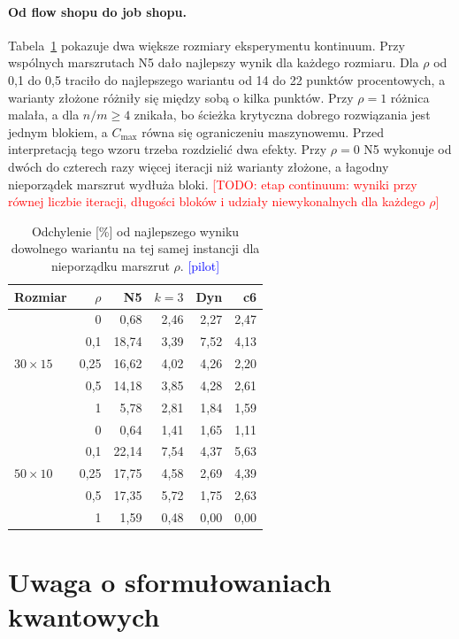 \documentclass[10pt,twocolumn]{article}
\newcommand{\todo}[1]{\textcolor{red}{[TODO: #1]}}
\newcommand{\pilot}{\textcolor{blue}{[pilot]}}
\newcommand{\Cmax}{C_{\max}}
\begin{document}
\paragraph{Od flow shopu do job shopu.}
Tabela~\ref{tab:rho} pokazuje dwa większe rozmiary eksperymentu
kontinuum. Przy wspólnych marszrutach N5 dało najlepszy wynik dla każdego
rozmiaru. Dla $\rho$ od 0,1 do 0,5 traciło do najlepszego wariantu od 14
do 22 punktów procentowych, a warianty złożone różniły się między sobą
o kilka punktów. Przy $\rho=1$ różnica malała, a dla $n/m\ge4$ znikała,
bo ścieżka krytyczna dobrego rozwiązania jest jednym blokiem, a $\Cmax$
równa się ograniczeniu maszynowemu. Przed interpretacją tego wzoru trzeba
rozdzielić dwa efekty. Przy $\rho=0$ N5 wykonuje od dwóch do czterech
razy więcej iteracji niż warianty złożone, a łagodny nieporządek marszrut
wydłuża bloki. \todo{etap continuum: wyniki przy równej liczbie iteracji,
długości bloków i udziały niewykonalnych dla każdego $\rho$}

\begin{table}[t]
\centering\small
\begin{tabular}{@{}lrrrrr@{}}
\toprule
Rozmiar & $\rho$ & N5 & $k{=}3$ & Dyn & c6 \\
\midrule
\multirow{5}{*}{$30\times15$}
 & 0    & 0,68  & 2,46 & 2,27 & 2,47 \\
 & 0,1  & 18,74 & 3,39 & 7,52 & 4,13 \\
 & 0,25 & 16,62 & 4,02 & 4,26 & 2,20 \\
 & 0,5  & 14,18 & 3,85 & 4,28 & 2,61 \\
 & 1    & 5,78  & 2,81 & 1,84 & 1,59 \\
\midrule
\multirow{5}{*}{$50\times10$}
 & 0    & 0,64  & 1,41 & 1,65 & 1,11 \\
 & 0,1  & 22,14 & 7,54 & 4,37 & 5,63 \\
 & 0,25 & 17,75 & 4,58 & 2,69 & 4,39 \\
 & 0,5  & 17,35 & 5,72 & 1,75 & 2,63 \\
 & 1    & 1,59  & 0,48 & 0,00 & 0,00 \\
\bottomrule
\end{tabular}
\caption{Odchylenie [\%] od najlepszego wyniku dowolnego wariantu na tej
samej instancji dla nieporządku marszrut $\rho$. \pilot}
\label{tab:rho}
\end{table}

\section{Uwaga o sformułowaniach kwantowych}
\end{document}
